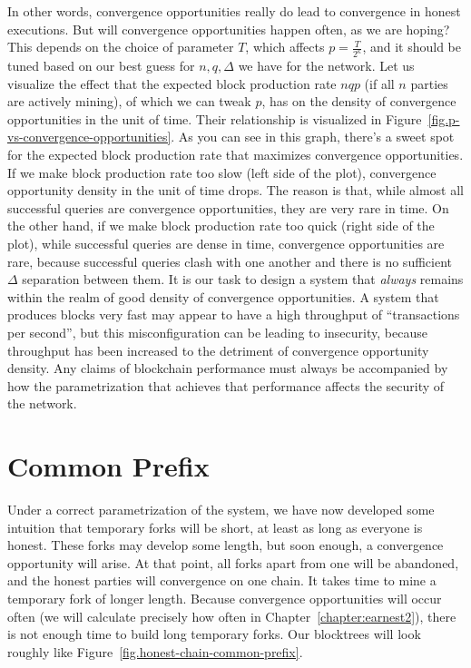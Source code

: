 In other words, convergence opportunities really do lead to convergence in honest executions.
But will convergence opportunities happen often, as we are hoping?
This depends on the choice of parameter $T$,
which affects $p = \frac{T}{2^\kappa}$, and it should be tuned based on our best guess for
$n, q, \Delta$ we have
for the network. Let us visualize the effect that the expected block production rate $nqp$
(if all $n$ parties are actively mining), of which we can tweak $p$, has on the density of
convergence opportunities in the unit of time. Their relationship is visualized in
Figure~\ref{fig.p-vs-convergence-opportunities}. As you can see in this graph, there's a
sweet spot for the expected block production rate that maximizes convergence opportunities.
If we make block production rate too slow (left side of the plot), convergence opportunity
density in the unit of time drops. The reason is that, while almost all successful queries
are convergence opportunities, they are very rare in time. On the other hand, if we make
block production rate too quick (right side of the plot), while successful queries are dense
in time, convergence opportunities are rare, because successful queries clash with one another
and there is no sufficient $\Delta$ separation between them. It is our task to design a system
that \emph{always} remains within the realm of good density of convergence opportunities.
A system that produces blocks
very fast may appear to have a high throughput of ``transactions per second'', but this
misconfiguration can be leading to insecurity, because throughput has been increased to
the detriment of convergence opportunity density. Any claims of blockchain performance
must always be accompanied by how the parametrization that achieves that performance affects
the security of the network.

\section{Common Prefix}
Under a correct parametrization of the system, we have now developed some intuition that
temporary forks will be short, at least as long as everyone is honest. These forks may
develop some length, but soon enough, a convergence opportunity will arise. At that point,
all forks apart from one will be abandoned, and the honest parties will convergence on
one chain. It takes time to mine a temporary fork of longer length.
Because convergence opportunities will occur often (we will
calculate precisely how often in Chapter~\ref{chapter:earnest2}),
there is not enough time to build long temporary forks. Our blocktrees will look roughly
like Figure~\ref{fig.honest-chain-common-prefix}.

